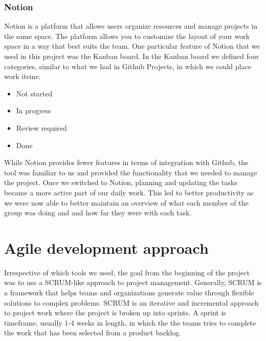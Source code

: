 \subsubsection{Notion}
Notion is a platform that allows users organize resources and manage projects in the same space. The platform allows you to customize the layout of your work space in a way that best suits the team. One particular feature of Notion that we used in this project was the Kanban board. In the Kanban board we defined four categories, similar to what we had in Github Projects, in which we could place work items:

\begin{itemize}
    \item Not started
    \item In progress
    \item Review required
    \item Done
\end{itemize}

While Notion provides fewer features in terms of integration with Github, the tool was familiar to us and provided the functionality that we needed to manage the project.
Once we switched to Notion, planning and updating the tasks became a more active part of our daily work. This led to better productivity as we were now able to better maintain an overview of what each member of the group was doing and and how far they were with each task.

\section{Agile development approach} \label{sec:agile-dev}
Irrespective of which tools we used, the goal from the beginning of the project was to use a SCRUM-like approach to project management. 
Generally, SCRUM is a framework that helps teams and organizations generate value through flexible solutions to complex problems. SCRUM is an iterative and incremental approach to project work where the project is broken up into sprints. A sprint is timeframe, usually 1-4 weeks in length, in which the the teams tries to complete the work that has been selected from a product backlog.


